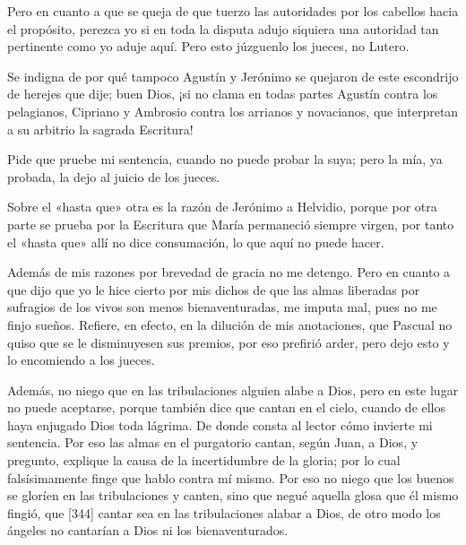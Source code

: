 Pero en cuanto a que se queja de que tuerzo las autoridades por los cabellos hacia el propósito, perezca yo si en toda la disputa adujo siquiera una autoridad tan pertinente como yo aduje aquí. Pero esto júzguenlo los jueces, no Lutero.

Se indigna de por qué tampoco Agustín y Jerónimo se quejaron de este escondrijo de herejes que dije; buen Dios, ¡si no clama en todas partes Agustín contra los pelagianos, Cipriano y Ambrosio contra los arrianos y novacianos, que interpretan a su arbitrio la sagrada Escritura!

Pide que pruebe mi sentencia, cuando no puede probar la suya; pero la mía, ya probada, la dejo al juicio de los jueces.

Sobre el «hasta que» otra es la razón de Jerónimo a Helvidio, porque por otra parte se prueba por la Escritura que María permaneció siempre virgen, por tanto el «hasta que» allí no dice consumación, lo que aquí no puede hacer.

Además de mis razones por brevedad de gracia no me detengo. Pero en cuanto a que dijo que yo le hice cierto por mis dichos de que las almas liberadas por sufragios de los vivos son menos bienaventuradas, me imputa mal, pues no me finjo sueños. Refiere, en efecto, en la dilución de mis anotaciones, que Pascual no quiso que se le disminuyesen sus premios, por eso prefirió arder, pero dejo esto y lo encomiendo a los jueces.

Además, no niego que en las tribulaciones alguien alabe a Dios, pero en este lugar no puede aceptarse, porque también dice que cantan en el cielo, cuando de ellos haya enjugado Dios toda lágrima. De donde consta al lector cómo invierte mi sentencia. Por eso las almas en el purgatorio cantan, según Juan, a Dios, y pregunto, explique la causa de la incertidumbre de la gloria; por lo cual falsísimamente finge que hablo contra mí mismo. Por eso no niego que los buenos se gloríen en las tribulaciones y canten, sino que negué aquella glosa que él mismo fingió, que [344] cantar sea en las tribulaciones alabar a Dios, de otro modo los ángeles no cantarían a Dios ni los bienaventurados.

